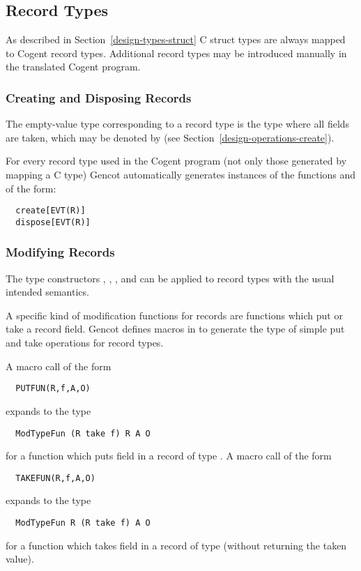 \subsection{Record Types}
\label{design-operations-record}

As described in Section~\ref{design-types-struct} C struct types are always mapped to Cogent record types.
Additional record types may be introduced manually in the translated Cogent program.

\subsubsection{Creating and Disposing Records}

The empty-value type corresponding to a record type  is the type  where all fields are taken,
which may be denoted by  (see Section~\ref{design-operations-create}).

For every record type  used in the Cogent program (not only those generated by mapping a C type) Gencot automatically
generates instances of the functions  and  of the form:
\begin{verbatim}
  create[EVT(R)]
  dispose[EVT(R)]
\end{verbatim}

\subsubsection{Modifying Records}

The type constructors , , , and  can be applied to record types with the 
usual intended semantics. 

A specific kind of modification functions for records are functions which put or take a record field. 
Gencot defines macros in  to generate the type of simple put and take operations for
record types.

A macro call of the form 
\begin{verbatim}
  PUTFUN(R,f,A,O)
\end{verbatim}
expands to the type
\begin{verbatim}
  ModTypeFun (R take f) R A O
\end{verbatim}
for a function which puts field  in a record of type . A macro call of the form
\begin{verbatim}
  TAKEFUN(R,f,A,O)
\end{verbatim}
expands to the type
\begin{verbatim}
  ModTypeFun R (R take f) A O
\end{verbatim}
for a function which takes field  in a record of type  (without returning the taken value).

